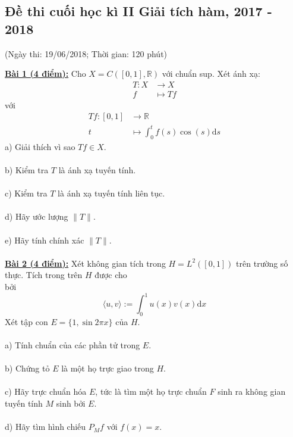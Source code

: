 \documentclass[10pt, a4paper]{article}
\begin{document}
\subsection{Đề thi cuối học kì II Giải tích hàm, 2017 - 2018}
\begin{center}
	\color{blue}(Ngày thi: 19/06/2018; Thời gian: 120 phút)
\end{center}
\color{red}\underline{\textbf{Bài 1 (4 điểm):}} \color{black}Cho $X=C([0,1],\mathbb R)$ với chuẩn sup. Xét ánh xạ:\begin{align*}
	T:X&\rightarrow X\\
	f&\mapsto Tf
\end{align*} với \begin{align*}
Tf:[0,1]&\rightarrow\mathbb R\\
t&\mapsto\displaystyle\int_0^tf(s)\cos(s)\text{d}s
\end{align*}
\color{red}a) \color{black}Giải thích vì sao $Tf\in X$.\\\\
\color{red}b) \color{black}Kiểm tra $T$ là ánh xạ tuyến tính.\\\\
\color{red}c) \color{black}Kiểm tra $T$ là ánh xạ tuyến tính liên tục.\\\\
\color{red}d) \color{black}Hãy ước lượng $\lVert T\rVert$.\\\\
\color{red}e) \color{black}Hãy tính chính xác $\lVert T\rVert$.\\\\
\color{red}\underline{\textbf{Bài 2 (4 điểm):}} \color{black}Xét không gian tích trong $H=L^2([0,1])$ trên trường số thực. Tích trong trên $H$ được cho\\ bởi $$\langle u,v\rangle:=\displaystyle\int_0^1u(x)v(x)\text{d}x$$ Xét tập con $E=\{1,\sin2\pi x\}$ của $H$.\\\\
\color{red}a) \color{black}Tính chuẩn của các phần tử trong $E$.\\\\
\color{red}b) \color{black}Chứng tỏ $E$ là một họ trực giao trong $H$.\\\\
\color{red}c) \color{black}Hãy trực chuẩn hóa $E$, tức là tìm một họ trực chuẩn $F$ sinh ra không gian tuyến tính $M$ sinh bởi $E$.\\\\
\color{red}d) \color{black}Hãy tìm hình chiếu $P_Mf$ với $f(x)=x$.\\\\
\end{document}

